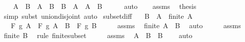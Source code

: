 \begin{isabellebody}
\ \ \isamarkupfalse%
\ {\isachardoublequoteopen}A\ {\isasymunion}\ B\ {\isacharequal}{\kern0pt}\ A\ {\isacharminus}{\kern0pt}\ B\ {\isasymunion}\ {\isacharparenleft}{\kern0pt}B\ {\isacharminus}{\kern0pt}\ A{\isacharparenright}{\kern0pt}\ {\isasymunion}\ A\ {\isasyminter}\ B{\isachardoublequoteclose}\isanewline
\ \ \ \ \isamarkupfalse%
\ auto\isanewline
\ \ \isamarkupfalse%
\ assms\ \isamarkupfalse%
\ {\isacharquery}{\kern0pt}thesis\isanewline
\ \ \ \ \isamarkupfalse%
\ simp\ {\isacharparenleft}{\kern0pt}subst\ union{\isacharunderscore}{\kern0pt}disjoint{\isacharcomma}{\kern0pt}\ auto{\isacharparenright}{\kern0pt}{\isacharplus}{\kern0pt}\isanewline
{}\isamarkupfalse%
%
\endisatagproof
{\isafoldproof}%
%
\isadelimproof
\isanewline
%
\endisadelimproof
\isanewline
{}\isamarkupfalse%
\ subset{\isacharunderscore}{\kern0pt}diff{\isacharcolon}{\kern0pt}\isanewline
\ \ \ {\isachardoublequoteopen}B\ {\isasymsubseteq}\ A{\isachardoublequoteclose}\ \ {\isachardoublequoteopen}finite\ A{\isachardoublequoteclose}\isanewline
\ \ \ {\isachardoublequoteopen}F\ g\ A\ {\isacharequal}{\kern0pt}\ F\ g\ {\isacharparenleft}{\kern0pt}A\ {\isacharminus}{\kern0pt}\ B{\isacharparenright}{\kern0pt}\ \isactrlbold {\isacharasterisk}{\kern0pt}\ F\ g\ B{\isachardoublequoteclose}\isanewline
%
\isadelimproof
%
\endisadelimproof
%
\isatagproof
{}\isamarkupfalse%
\ {\isacharminus}{\kern0pt}\isanewline
\ \ \isamarkupfalse%
\ assms\ \isamarkupfalse%
\ {\isachardoublequoteopen}finite\ {\isacharparenleft}{\kern0pt}A\ {\isacharminus}{\kern0pt}\ B{\isacharparenright}{\kern0pt}{\isachardoublequoteclose}\ \isamarkupfalse%
\ auto\isanewline
\ \ \isamarkupfalse%
\ \isamarkupfalse%
\ assms\ \isamarkupfalse%
\ {\isachardoublequoteopen}finite\ B{\isachardoublequoteclose}\ \isamarkupfalse%
\ {\isacharparenleft}{\kern0pt}rule\ finite{\isacharunderscore}{\kern0pt}subset{\isacharparenright}{\kern0pt}\isanewline
\ \ \isamarkupfalse%
\ \isamarkupfalse%
\ assms\ \isamarkupfalse%
\ {\isachardoublequoteopen}{\isacharparenleft}{\kern0pt}A\ {\isacharminus}{\kern0pt}\ B{\isacharparenright}{\kern0pt}\ {\isasyminter}\ B\ {\isacharequal}{\kern0pt}\ {\isacharbraceleft}{\kern0pt}{\isacharbraceright}{\kern0pt}{\isachardoublequoteclose}\ \isamarkupfalse%
\ auto\isanewline

\end{isabellebody}

